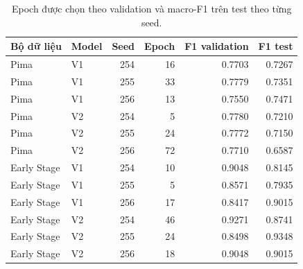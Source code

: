 \par\FloatBarrier\begin{table}[H]\centering\small{}\setlength{\tabcolsep}{5pt}
\caption{Epoch được chọn theo validation và macro-F1 trên test theo từng seed.}\begin{tabular}{llrrrr}\toprule
Bộ dữ liệu & Model & Seed & Epoch & F1 validation & F1 test\\\midrule
Pima & V1 & 254 & 16 & 0.7703 & 0.7267\\
Pima & V1 & 255 & 33 & 0.7779 & 0.7351\\
Pima & V1 & 256 & 13 & 0.7550 & 0.7471\\
Pima & V2 & 254 & 5 & 0.7780 & 0.7210\\
Pima & V2 & 255 & 24 & 0.7772 & 0.7150\\
Pima & V2 & 256 & 72 & 0.7710 & 0.6587\\
Early Stage & V1 & 254 & 10 & 0.9048 & 0.8145\\
Early Stage & V1 & 255 & 5 & 0.8571 & 0.7935\\
Early Stage & V1 & 256 & 17 & 0.8417 & 0.9015\\
Early Stage & V2 & 254 & 46 & 0.9271 & 0.8741\\
Early Stage & V2 & 255 & 24 & 0.8498 & 0.9348\\
Early Stage & V2 & 256 & 18 & 0.9048 & 0.9015\\\bottomrule\end{tabular}\end{table}
